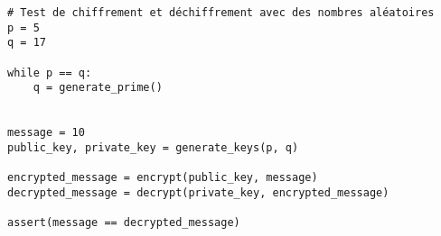 \begin{tcolorbox}[
    enhanced,
    attach boxed title to top left={xshift=6mm,yshift=-3mm},
    colback=lightgreen!20,
    colframe=lightgreen,
    colbacktitle=lightgreen,
    title=Test de notre programme de chiffrement RSA,
    fonttitle=\bfseries\color{black},
    boxed title style={size=small,colframe=lightgreen,sharp corners},
    sharp corners,
]    
    \begin{verbatim}
# Test de chiffrement et déchiffrement avec des nombres aléatoires
p = 5
q = 17

while p == q:
    q = generate_prime()


message = 10
public_key, private_key = generate_keys(p, q)

encrypted_message = encrypt(public_key, message)
decrypted_message = decrypt(private_key, encrypted_message)

assert(message == decrypted_message)
    \end{verbatim}
\end{tcolorbox}